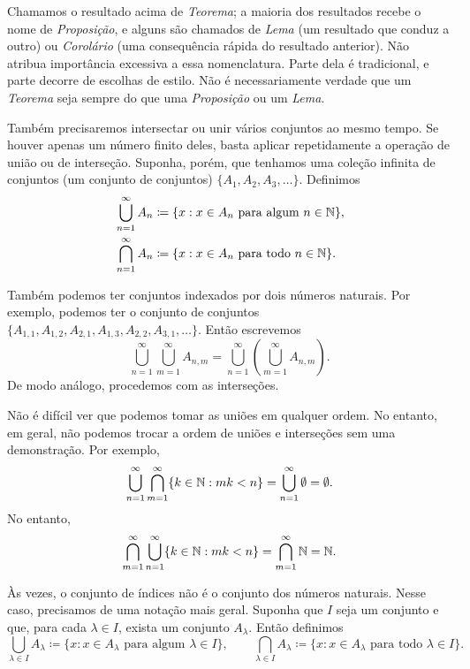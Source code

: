 Chamamos o resultado acima de \emph{Teorema}; a maioria dos resultados recebe
o nome de \emph{Proposição}, e alguns são chamados de \emph{Lema} (um
resultado que conduz a outro) ou \emph{Corolário} (uma consequência rápida do
resultado anterior).
Não atribua importância excessiva a essa nomenclatura. Parte dela é
tradicional, e parte decorre de escolhas de estilo.
Não é necessariamente verdade que um \emph{Teorema} seja sempre
 do que uma \emph{Proposição} ou um \emph{Lema}.

\medskip

Também precisaremos intersectar ou unir vários conjuntos ao mesmo tempo. Se
houver apenas um número finito deles, basta aplicar repetidamente a operação
de união ou de interseção. Suponha, porém, que tenhamos uma coleção infinita
de conjuntos (um conjunto de conjuntos)
$\{ A_1, A_2, A_3, \ldots \}$. Definimos
\begin{align*}
& \bigcup_{n=1}^\infty A_n \coloneqq \{ x : x \in A_n \text{ para algum } n \in {\mathbb{N}}
\} , \\
& \bigcap_{n=1}^\infty A_n \coloneqq \{ x : x \in A_n \text{ para todo } n \in {\mathbb{N}}
\} .
\end{align*}

Também podemos ter conjuntos indexados por dois números naturais. Por
exemplo, podemos ter o conjunto de conjuntos
$\{ A_{1,1}, A_{1,2}, A_{2,1}, A_{1,3}, A_{2,2}, A_{3,1}, \ldots \}$. Então
escrevemos
\begin{equation*}
\bigcup_{n=1}^\infty \bigcup_{m=1}^\infty A_{n,m}
=
\bigcup_{n=1}^\infty \left( \bigcup_{m=1}^\infty A_{n,m} \right) .
\end{equation*}
De modo análogo, procedemos com as interseções.

Não é difícil ver que podemos tomar as uniões em qualquer ordem. No entanto,
em geral, não podemos trocar a ordem de uniões e interseções sem uma
demonstração.
Por exemplo,
\begin{equation*}
\bigcup_{n=1}^\infty
\bigcap_{m=1}^\infty
\{ k \in {\mathbb{N}} : mk < n \}
=
\bigcup_{n=1}^\infty \emptyset = \emptyset .
\end{equation*}
No entanto,
\begin{equation*}
\bigcap_{m=1}^\infty
\bigcup_{n=1}^\infty
\{ k \in {\mathbb{N}} : mk < n \}
=
\bigcap_{m=1}^\infty
{\mathbb{N}}
=
{\mathbb{N}}.
\end{equation*}

Às vezes, o conjunto de índices não é o conjunto dos números naturais. Nesse
caso, precisamos de uma notação mais geral. Suponha que $I$ seja um conjunto
e que, para cada $\lambda \in I$, exista um conjunto $A_\lambda$. Então
definimos
\begin{equation*}
\bigcup_{\lambda \in I} A_\lambda \coloneqq \{ x : x \in A_\lambda \text{ para algum }
\lambda \in I
\} ,
\qquad
\bigcap_{\lambda \in I} A_\lambda \coloneqq \{ x : x \in A_\lambda \text{ para todo }
\lambda \in I
\} .
\end{equation*}


